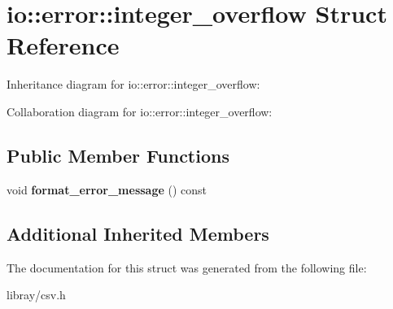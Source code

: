 \hypertarget{structio_1_1error_1_1integer__overflow}{}\section{io\+:\+:error\+:\+:integer\+\_\+overflow Struct Reference}
\label{structio_1_1error_1_1integer__overflow}


Inheritance diagram for io\+:\+:error\+:\+:integer\+\_\+overflow\+:


Collaboration diagram for io\+:\+:error\+:\+:integer\+\_\+overflow\+:
\subsection*{Public Member Functions}
\begin{DoxyCompactItemize}
\item 
\mbox{\label{structio_1_1error_1_1integer__overflow_a25825600c3c29210160ba201519e6312}} 
void {\bfseries format\+\_\+error\+\_\+message} () const
\end{DoxyCompactItemize}
\subsection*{Additional Inherited Members}


The documentation for this struct was generated from the following file\+:\begin{DoxyCompactItemize}
\item 
libray/csv.\+h\end{DoxyCompactItemize}
